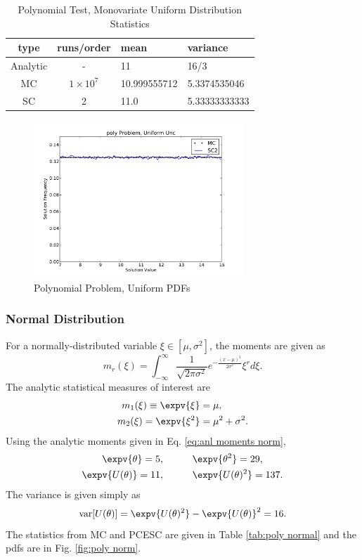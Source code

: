 \begin{table}[H]
\begin{center}
\begin{tabular}{c c|l l}
type & runs/order & mean & variance \\ \hline
Analytic & - & 11 & 16/3 \\
MC & $1\times10^7$ & 10.999555712 & 5.3374535046 \\
SC & 2 & 11.0 & 5.33333333333
\end{tabular}
\end{center}
\caption{Polynomial Test, Monovariate Uniform Distribution Statistics}
\label{tab:poly uniform}
\end{table}

\begin{figure}[H]
\centering
   \includegraphics[width=0.7\textwidth]{../graphics/poly_uniform_pdfs}
   \caption{Polynomial Problem, Uniform PDFs}
      \label{fig:poly uni}
\end{figure}

\subsubsection{Normal Distribution}
For a normally-distributed variable $\xi\in[\mu,\sigma^2]$, the moments are given as
\begin{equation}
m_r(\xi)=\int_{-\infty}^\infty \frac{1}{\sqrt{2\pi\sigma^2}}e^{-\frac{(x-\mu)^2}{2\sigma^2}}\xi^r d\xi.
\end{equation}
The analytic statistical measures of interest are
\begin{align}\label{eq:anl moments norm}
m_1(\xi)\equiv\expv{\xi}&=\mu,\\
m_2(\xi)=\expv{\xi^2}&=\mu^2+\sigma^2.
\end{align}
Using the analytic moments given in Eq. \ref{eq:anl moments norm},
\begin{align}
\expv{\theta} = 5, &\hspace{30pt}\expv{\theta^2}=29,\\
\expv{U(\theta)}=11, &\hspace{30pt}\expv{U(\theta)^2}=137.
\end{align}
The variance is given simply as
\begin{equation}
\text{var}[U(\theta)]=\expv{U(\theta)^2}-\expv{U(\theta)}^2=16.
\end{equation}
The statistics from MC and PCESC are given in Table \ref{tab:poly normal} and the pdfs are in Fig. \ref{fig:poly norm}.

